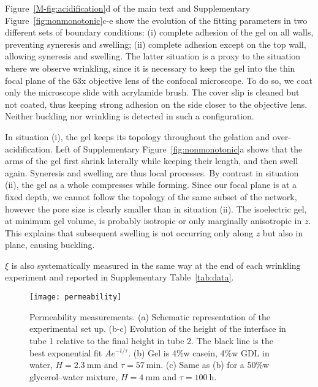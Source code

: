 \documentclass[twocolumn,superscriptaddress,showpacs,preprintnumbers,
amsmath,amssymb,prl]{revtex4-1}
\begin{document}
Figure~\ref{M-fig:acidification}d of the main text and Supplementary Figure~\ref{fig:nonmonotonic}c-e show the evolution of the fitting parameters in two different sets of boundary conditions: (i) complete adhesion of the gel on all walls, preventing syneresis and swelling; (ii) complete adhesion except on the top wall, allowing syneresis and swelling. The latter situation is a proxy to the situation where we observe wrinkling, since it is necessary to keep the gel into the thin focal plane of the 63x objective lens of the confocal microscope. To do so, we coat only the microscope slide with acrylamide brush. The cover slip is cleaned but not coated, thus keeping strong adhesion on the side closer to the objective lens. Neither buckling nor wrinkling is detected in such a configuration.

In situation (i), the gel keeps its topology throughout the gelation and over-acidification. Left of Supplementary Figure~\ref{fig:nonmonotonic}a shows that the arms of the gel first shrink laterally while keeping their length, and then swell again. Syneresis and swelling are thus local processes. By contrast in situation (ii), the gel as a whole compresses while forming. Since our focal plane is at a fixed depth, we cannot follow the topology of the same subset of the network, however the pore size is clearly smaller than in situation (ii). The isoelectric gel, at minimum gel volume, is probably isotropic or only marginally anisotropic in $z$. This explains that subsequent swelling is not occurring only along $z$ but also in plane, causing buckling.

$\xi$ is also systematically measured in the same way at the end of each wrinkling experiment and reported in Supplementary Table~\ref{tab:data}. %


\begin{figure*}%
	\texttt{[image: permeability]}%
	\caption{Permeability measurements. (a) Schematic representation of the experimental set up. (b-c) Evolution of the height of the interface in tube 1 relative to the final height in tube 2. The black line is the best exponential fit $Ae^{-t/\tau}$. (b) Gel is 4\%w casein, 4\%w GDL in water, $H=\SI{2.3}{\milli\metre}$ and $\tau=\SI{57}{\minute}$. (c) Same as (b) for a 50\%w glycerol--water mixture, $H=\SI{4}{\milli\metre}$ and $\tau=\SI{100}{\hour}$.}%
	\label{fig:permeability}%
\end{figure*}
\end{document}
